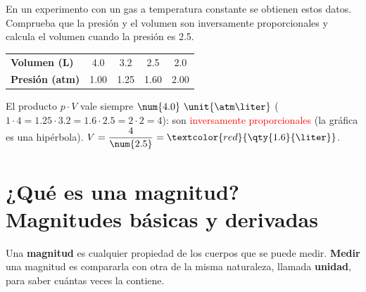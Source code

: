 \begin{exercise}
    En un experimento con un gas a temperatura constante se obtienen estos datos. Comprueba que la presión y el volumen son inversamente proporcionales y calcula el volumen cuando la presión es \qty{2.5}{\atm}.
    \begin{center}
        \begin{tabular}{@{}lcccc@{}}
            \toprule
            \textbf{Volumen (L)} & \num{4.0} & \num{3.2} & \num{2.5} & \num{2.0} \\[3pt]
            \textbf{Presión (atm)} & \num{1.00} & \num{1.25} & \num{1.60} & \num{2.00} \\
            \bottomrule
        \end{tabular}
    \end{center}
    \begin{solu}
        El producto \(p \cdot V\) vale siempre \(\num{4.0}~\unit{\atm\liter}\) (\(1 \cdot 4 = \num{1.25} \cdot \num{3.2} = \num{1.6} \cdot \num{2.5} = 2 \cdot 2 = 4\)): son \textcolor{red}{inversamente proporcionales} (la gráfica es una hipérbola).
        \(V = \dfrac{4}{\num{2.5}} = \textcolor{red}{\qty{1.6}{\liter}}\).
    \end{solu}
\end{exercise}

\section[Magnitudes básicas y derivadas]{¿Qué es una magnitud? Magnitudes básicas y derivadas}

\begin{definition}
    Una \textbf{magnitud} es cualquier propiedad de los cuerpos que se puede medir. \textbf{Medir} una magnitud es compararla con otra de la misma naturaleza, llamada \textbf{unidad}, para saber cuántas veces la contiene.
\end{definition}

